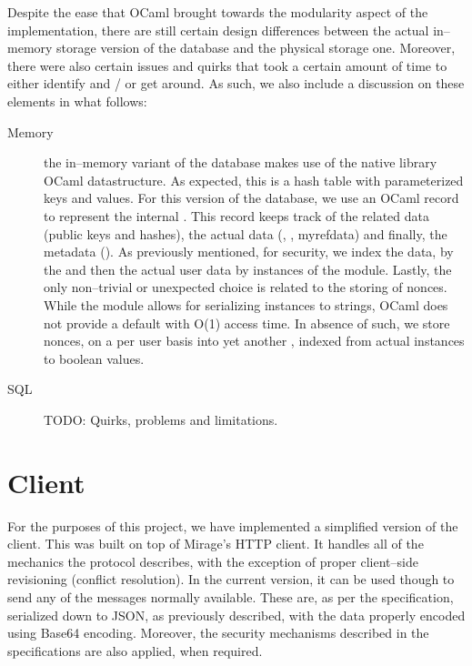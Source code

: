 Despite the ease that OCaml brought towards the modularity aspect of the implementation, there are still certain design differences between the actual in--memory storage version of the database and the physical storage one.
Moreover, there were also certain issues and quirks that took a certain amount of time to either identify and / or get around.
As such, we also include a discussion on these elements in what follows:
\begin{description}
  \item[Memory] the in--memory variant of the database makes use of the native library OCaml  datastructure.
  As expected, this is a hash table with parameterized keys and values.
  For this version of the database, we use an OCaml record to represent the internal .
  This record keeps track of the  related data (public keys and hashes), the actual data (, , myref{data}) and finally, the metadata ().
  As previously mentioned, for security, we index the  data, by the  and then the actual user data by instances of the  module.
  Lastly, the only non--trivial or unexpected choice is related to the storing of nonces.
  While the  module allows for serializing instances to strings, OCaml does not provide a default  with O(1) access time.
  In absence of such, we store nonces, on a per user basis into yet another , indexed from actual  instances to boolean values.

  \item[SQL] TODO: Quirks, problems and limitations.
\end{description}

\section{Client}
For the purposes of this project, we have implemented a simplified version of the client.
This was built on top of Mirage's  HTTP client.
It handles all of the mechanics the protocol describes, with the exception of proper client--side revisioning (conflict resolution).
In the current version, it can be used though to send any of the messages normally available.
These are, as per the specification, serialized down to JSON, as previously described, with the data properly encoded using Base64 encoding.
Moreover, the security mechanisms described in the specifications are also applied, when required.

